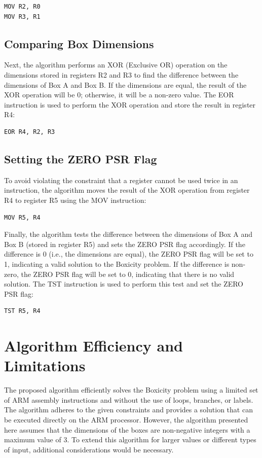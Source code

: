 \begin{verbatim}
MOV R2, R0
MOV R3, R1
\end{verbatim}

\subsection{Comparing Box Dimensions}

Next, the algorithm performs an XOR (Exclusive OR) operation on the dimensions stored in registers R2 and R3 to find the difference between the dimensions of Box A and Box B. If the dimensions are equal, the result of the XOR operation will be 0; otherwise, it will be a non-zero value. The EOR instruction is used to perform the XOR operation and store the result in register R4:

\begin{verbatim}
EOR R4, R2, R3
\end{verbatim}

\subsection{Setting the ZERO PSR Flag}

To avoid violating the constraint that a register cannot be used twice in an instruction, the algorithm moves the result of the XOR operation from register R4 to register R5 using the MOV instruction:

\begin{verbatim}
MOV R5, R4
\end{verbatim}

Finally, the algorithm tests the difference between the dimensions of Box A and Box B (stored in register R5) and sets the ZERO PSR flag accordingly. If the difference is 0 (i.e., the dimensions are equal), the ZERO PSR flag will be set to 1, indicating a valid solution to the Boxicity problem. If the difference is non-zero, the ZERO PSR flag will be set to 0, indicating that there is no valid solution. The TST instruction is used to perform this test and set the ZERO PSR flag:

\begin{verbatim}
TST R5, R4
\end{verbatim}

\section{Algorithm Efficiency and Limitations}

The proposed algorithm efficiently solves the Boxicity problem using a limited set of ARM assembly instructions and without the use of loops, branches, or labels. The algorithm adheres to the given constraints and provides a solution that can be executed directly on the ARM processor. However, the algorithm presented here assumes that the dimensions of the boxes are non-negative integers with a maximum value of 3. To extend this algorithm for larger values or different types of input, additional considerations would be necessary.


